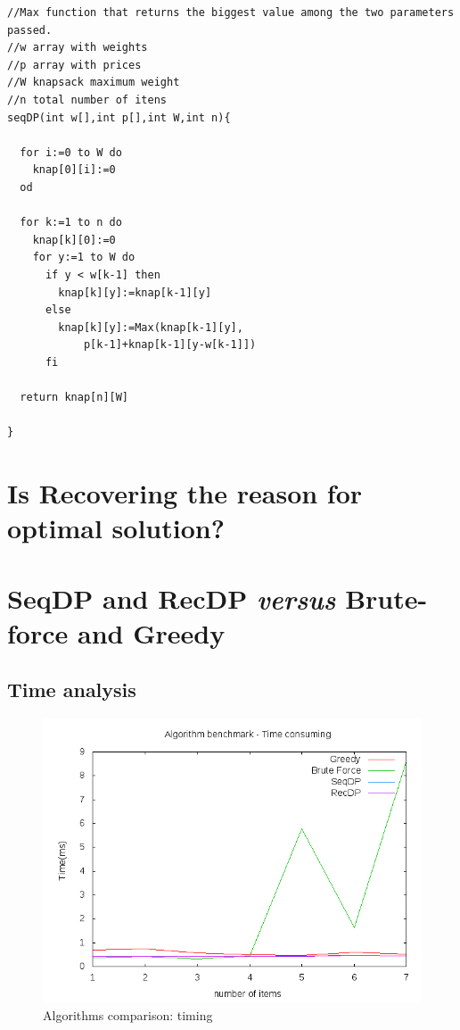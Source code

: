 \documentclass{article}
\begin{document}
\begin{lstlisting}
//Max function that returns the biggest value among the two parameters passed.
//w array with weights
//p array with prices
//W knapsack maximum weight
//n total number of itens
seqDP(int w[],int p[],int W,int n){

  for i:=0 to W do
    knap[0][i]:=0
  od

  for k:=1 to n do
    knap[k][0]:=0
    for y:=1 to W do
      if y < w[k-1] then
        knap[k][y]:=knap[k-1][y]
      else
        knap[k][y]:=Max(knap[k-1][y],
			p[k-1]+knap[k-1][y-w[k-1]])
      fi

  return knap[n][W]

}
\end{lstlisting}


\section{Is Recovering the reason for optimal solution?}          

\section{SeqDP and RecDP \textit{versus} Brute-force and Greedy}

\subsection{Time analysis}

\begin{figure} [H]
\includegraphics[scale=0.4]{report/time_analysis}
\caption{Algorithms comparison: timing}
\label{report/time_analysis}
\end{figure}
\end{document}
